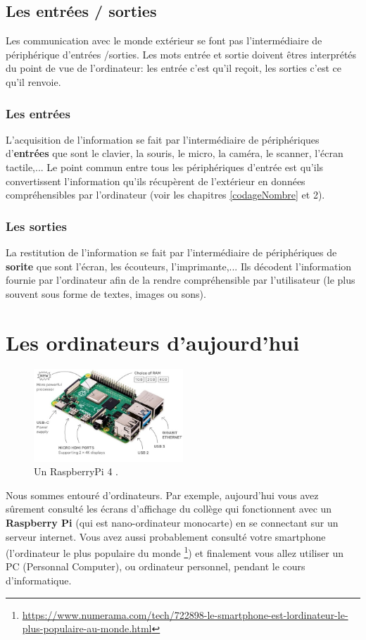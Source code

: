 \subsection{Les entrées / sorties}
Les communication avec le monde extérieur se font pas l'intermédiaire de périphérique d'entrées /sorties. Les mots entrée et sortie doivent êtres interprétés du point de vue de l'ordinateur: les entrée c'est qu'il reçoit, les sorties c'est ce qu'il renvoie.

\subsubsection{Les entrées}
L’acquisition de l’information se fait par l’intermédiaire de périphériques d’\textbf{entrées} que sont le clavier, la souris, le micro, la caméra, le scanner, l’écran tactile,... Le point commun entre tous les périphériques d'entrée est qu'ils convertissent l'information qu'ils récupèrent de l'extérieur en données compréhensibles par l'ordinateur (voir les chapitres \ref{codageNombre} et 2).

\subsubsection{Les sorties}
La restitution de l’information se fait par l’intermédiaire de périphériques de \textbf{sorite} que sont l'écran, les écouteurs, l'imprimante,... Ils décodent l'information fournie par l'ordinateur afin de la rendre compréhensible par l'utilisateur (le plus souvent sous forme de textes, images ou sons).

\section{Les ordinateurs d'aujourd'hui}
\begin{figure}
	\centering
	\includegraphics[trim=0 0 0 120,width=0.5\textwidth]{Images/ordinateur/raspberry-pi-4-caracteristiques.jpg}
	\caption{\small Un RaspberryPi 4 .}
\end{figure}
Nous sommes entouré d'ordinateurs. Par exemple, aujourd'hui vous avez sûrement consulté les écrans d'affichage du collège qui fonctionnent avec un \textbf{Raspberry Pi} (qui est nano-ordinateur monocarte) en se connectant sur un serveur internet. Vous avez aussi probablement consulté votre smartphone (l'ordinateur le plus populaire du monde \footnote{ \url{https://www.numerama.com/tech/722898-le-smartphone-est-lordinateur-le-plus-populaire-au-monde.html}})
et finalement vous allez utiliser un PC (Personnal Computer), ou ordinateur personnel, pendant le cours d'informatique.
\newpage

